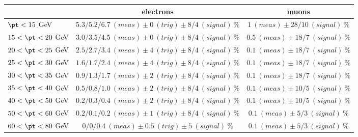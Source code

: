 \begin{table}[htb!]
	\begin{center}
	    \begin{tabular}{|l|c|c|}
	     \hline
	                              & \textbf{electrons}                                    &  \textbf{muons}                   \\
	     \hline
	     \hline
		 $\pt < 15$ GeV       & $5.3/5.2/6.7~(meas) \pm 0~(trig) \pm 8/4~(signal)~\%$ & $1~(meas)   \pm 28/10 ~(signal)~\%$\\
	     \hline                                                                
		 $15 < \pt < 20$ GeV  & $3.0/3.5/4.5~(meas) \pm 0~(trig) \pm 8/4~(signal)~\%$ & $0.5~(meas) \pm 18/7 ~(signal)~\%$\\
	     \hline                                                                                            
		 $20 < \pt < 25$ GeV  & $2.5/2.7/3.4~(meas) \pm 4~(trig) \pm 8/4~(signal)~\%$ & $0.1~(meas) \pm 18/7 ~(signal)~\%$\\
	     \hline                                                                                            
		 $25 < \pt < 30$ GeV  & $1.6/1.7/2.4~(meas) \pm 4~(trig) \pm 8/4~(signal)~\%$ & $0.1~(meas) \pm 18/7 ~(signal)~\%$\\
	     \hline                                                                                            
		 $30 < \pt < 35$ GeV  & $0.9/1.3/1.7~(meas) \pm 2~(trig) \pm 8/4~(signal)~\%$ & $0.1~(meas) \pm 18/7 ~(signal)~\%$\\
	     \hline                                                                            
		 $35 < \pt < 40$ GeV  & $0.5/0.8/1.0~(meas) \pm 2~(trig) \pm 8/4~(signal)~\%$ & $0.1~(meas) \pm 10/5 ~(signal)~\%$\\
	     \hline                                                                                            
		 $40 < \pt < 50$ GeV  & $0.2/0.3/0.4~(meas) \pm 2~(trig) \pm 8/4~(signal)~\%$ & $0.1~(meas) \pm 10/5 ~(signal)~\%$\\
	     \hline                                                                            
		 $50 < \pt < 60$ GeV  & $0.2/0.1/0.2~(meas) \pm 1~(trig) \pm 8/4~(signal)~\%$ & $0.1~(meas) \pm 5/3 ~(signal)~\%$\\
	     \hline                                                                                            
		 $60 < \pt < 80$ GeV  & $0/0/0.4~(meas)     \pm 0.5~(trig) \pm 5~(signal)~\%$ & $0.1~(meas) \pm 5/3 ~(signal)~\%$\\

\end{tabular}
\end{center}
\end{table}
